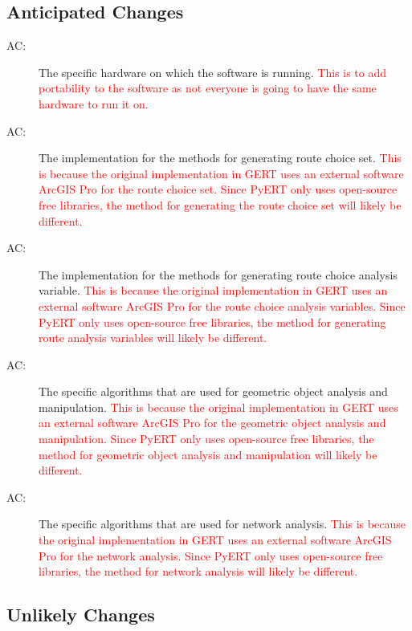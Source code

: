 \documentclass[12pt, titlepage]{article}
\newcounter{acnum}
\newcommand{\actheacnum}{AC\theacnum}
\begin{document}
\subsection{Anticipated Changes} \label{SecAchange}

\begin{description}
\item[ \actheacnum \label{acHardware}:] The specific hardware on which the software is running. \textcolor{red}{This is to add portability to the software as not everyone is going to have the same hardware to run it on.}
\item[ \actheacnum \label{acRCSG}:]  The implementation for the methods for generating route choice set. \textcolor{red}{This is because the original implementation in GERT uses an external software ArcGIS Pro for the route choice set. Since PyERT only uses open-source free libraries, the method for generating \textcolor{red}{the} route choice set will likely be different.}
\item[ \actheacnum \label{acRCAVG}:]  The implementation for the methods for generating route choice analysis variable. \textcolor{red}{This is because the original implementation in GERT uses an external software ArcGIS Pro for the route choice analysis variables. Since PyERT only uses open-source free libraries, the method for generating route analysis variables will likely be different.}
\item[ \actheacnum \label{acGOAM}:] The specific algorithms that are used for geometric object analysis and manipulation. \textcolor{red}{This is because the original implementation in GERT uses an external software ArcGIS Pro for the geometric object analysis and manipulation. Since PyERT only uses open-source free libraries, the method for geometric object analysis and manipulation will likely be different.}
\item[ \actheacnum \label{acNA}:] The specific algorithms that are used for network analysis. \textcolor{red}{This is because the original implementation in GERT uses an external software ArcGIS Pro for the network analysis. Since PyERT only uses open-source free libraries, the method for network analysis will likely be different.}
\end{description}

\subsection{Unlikely Changes} \label{SecUchange}
\end{document}
